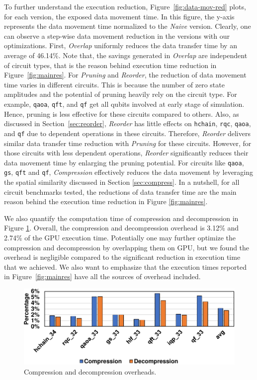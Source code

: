 To further understand the execution reduction, Figure~\ref{fig:data-mov-red} plots, for each version, the exposed data movement time. In this figure, the y-axis represents the data movement time normalized to the {\it Naive} version. Clearly, one can observe a step-wise data movement reduction in the versions with our optimizations. 
First, {\it Overlap} uniformly reduces the data transfer time by an average of 46.14\%. Note that, the savings generated in {\it Overlap} are independent of circuit types, that is the reason behind execution time reduction in Figure~\ref{fig:mainres}. 
For {\it Pruning} and {\it Reorder}, the reduction of data movement time varies in different circuits. This is because the number of zero state amplitudes and the potential of pruning heavily rely on the circuit type. 
For example,  {\tt qaoa}, {\tt qft}, and {\tt qf} get all qubits involved at early stage of simulation. Hence, pruning is less effective for these circuits compared to others. 
Also, as discussed in Section~\ref{sec:reorder}, {\it Reorder} has little effects on {\tt hchain}, {\tt rqc}, {\tt qaoa}, and {\tt qf} due to dependent operations in these circuits. 
Therefore, {\it Reorder} delivers similar data transfer time reduction with  {\it Pruning} for these circuits. However, for those circuits with less dependent operations, {\it Reorder} significantly reduces their data movement time by enlarging the pruning potential. For circuits like  {\tt qaoa}, {\tt gs}, {\tt qft} and {\tt qf},  {\it Compression} effectively reduces the data movement by leveraging the spatial similarity discussed in Section \ref{sec:compress}. 
In a nutshell, for all circuit benchmarks tested, the reductions of data transfer time are the main reason behind the execution time reduction in Figure \ref{fig:mainres}.

We also quantify the computation time of compression and decompression in Figure \ref{fig:overhead}. Overall, the compression and decompression overhead is 3.12\% and 2.74\% of the GPU execution time. Potentially one may further optimize the compression and decompression by overlapping them on GPU, but we found the overhead is negligible compared to the significant reduction in execution time that we achieved. We also want to emphasize that the execution times reported in Figure~\ref{fig:mainres} have all the sources of overhead included.

\begin{figure}[t!]
    \centering
    \includegraphics[width=\textwidth]{Images/appendix2/section-5/overhead.pdf}
    \caption{Compression and decompression overheads.}
    \label{fig:overhead}
    \vspace{-5pt}
\end{figure}



